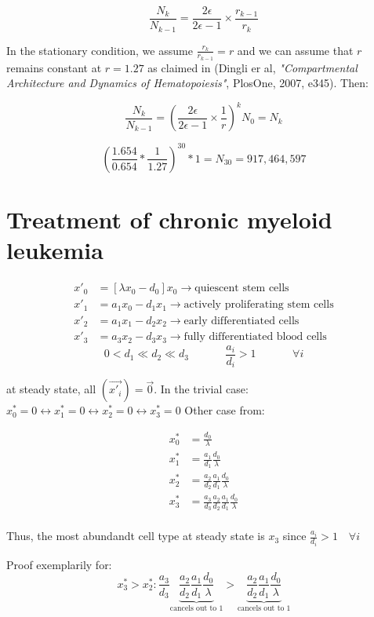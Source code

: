 \[ \frac{N_k}{N_{k-1}} = \frac{2\epsilon}{2\epsilon - 1} \times \frac{r_{k-1}}{r_k}\]

In the stationary condition, we assume $\frac{r_k}{r_{k-1}} = r$ and we can assume that $r$ remains constant at $r=1.27$ as claimed in (Dingli er al, \textit{"Compartmental Architecture and Dynamics of Hematopoiesis"}, PlosOne, 2007, e345).
Then:

\[ \frac{N_k}{N_{k-1}} = \left( \frac{2\epsilon}{2\epsilon-1} \times \frac{1}{r} \right)^k N_0 = N_k \]

\[ \left( \frac{1.654}{0.654}*\frac{1}{1.27} \right)^{30} * 1 =  N_{30} = 917,464,597  \]


\setcounter{chapter}{3}
\setcounter{section}{0}
\section{Treatment of chronic myeloid leukemia}

\begin{align*}
x'_0 &= [\lambda x_0 - d_0]x_0 \rightarrow \text{quiescent stem cells}\\
x'_1 &= a_1x_0 - d_1x_1 \rightarrow \text{actively proliferating stem cells}\\
x'_2 &= a_1x_1 - d_2x_2 \rightarrow \text{early differentiated cells}\\
x'_3 &= a_3x_2 - d_3x_3 \rightarrow \text{fully differentiated blood cells}
\end{align*}
\[ 0 < d_1 \ll d_2 \ll d_3 \text{~~~~~~~~~~} \frac{a_i}{d_i} > 1  \text{~~~~~~~~~~} \forall i \]

at steady state, all $(\vec{x'_i}) = \vec{0}$. In the trivial case: $x^*_0 = 0 \leftrightarrow x^*_1 = 0 \leftrightarrow x^*_2 = 0 \leftrightarrow x^*_3 = 0$
Other case from:

\begin{align*}
x^*_0 &= \frac{d_0}{\lambda}\\
x^*_1 &= \frac{a_1}{d_1}\frac{d_0}{\lambda}\\
x^*_2 &= \frac{a_2}{d_2}\frac{a_1}{d_1}\frac{d_0}{\lambda}\\
x^*_3 &= \frac{a_3}{d_3}\frac{a_2}{d_2}\frac{a_1}{d_1}\frac{d_0}{\lambda}\\
\end{align*}

Thus, the most abundandt cell type at steady state is $x_3$ since $\frac{a_i}{d_i} > 1 \text{~~~} \forall i $

Proof exemplarily for: \[x^*_3 > x^*_2 : \frac{a_3}{d_3}  \underbrace{\frac{a_2}{d_2}\frac{a_1}{d_1}\frac{d_0}{\lambda}}_\text{cancels out to 1} >  \underbrace{\frac{a_2}{d_2}\frac{a_1}{d_1}\frac{d_0}{\lambda}}_\text{cancels out to 1}\]

